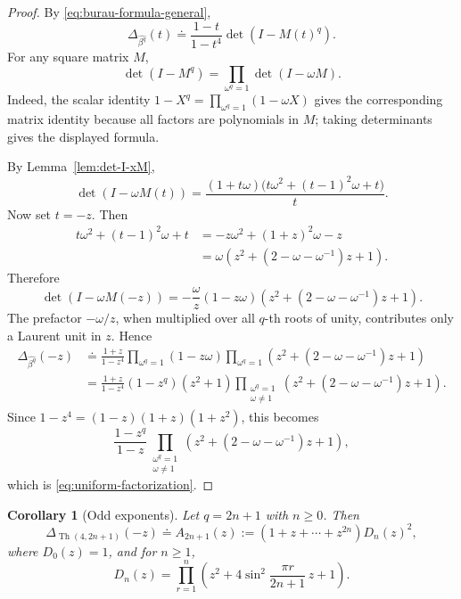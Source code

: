 \documentclass[11pt]{amsart}
\newtheorem{corollary}[theorem]{Corollary}
\newcommand{\Th}{\operatorname{Th}}
\newcommand{\dd}{\doteq}
\begin{document}
\begin{proof}
By \eqref{eq:burau-formula-general},
\[
        \Delta_{\widehat{\beta^q}}(t)
        \dd
        \frac{1-t}{1-t^4}\det(I-M(t)^q).
\]
For any square matrix \(M\),
\[
        \det(I-M^q)=\prod_{\omega^q=1}\det(I-\omega M).
\]
Indeed, the scalar identity \(1-X^q=\prod_{\omega^q=1}(1-\omega X)\) gives the corresponding matrix identity because all factors are polynomials in \(M\); taking determinants gives the displayed formula.

By Lemma~\ref{lem:det-I-xM},
\[
        \det(I-\omega M(t))
        =\frac{(1+t\omega)\bigl(t\omega^2+(t-1)^2\omega+t\bigr)}{t}.
\]
Now set \(t=-z\).  Then
\[
\begin{aligned}
        t\omega^2+(t-1)^2\omega+t
        &=-z\omega^2+(1+z)^2\omega-z  \\
        &=\omega\left(z^2+(2-\omega-\omega^{-1})z+1\right).
\end{aligned}
\]
Therefore
\begin{equation}\label{eq:single-root-factor}
        \det(I-\omega M(-z))
        =-\frac{\omega}{z}(1-z\omega)
        \left(z^2+(2-\omega-\omega^{-1})z+1\right).
\end{equation}
The prefactor \(-\omega/z\), when multiplied over all \(q\)-th roots of unity, contributes only a Laurent unit in \(z\).  Hence
\[
\begin{aligned}
\Delta_{\widehat{\beta^q}}(-z)
&\dd
\frac{1+z}{1-z^4}
\prod_{\omega^q=1}(1-z\omega)
\prod_{\omega^q=1}
\left(z^2+(2-\omega-\omega^{-1})z+1\right)  \\
&=
\frac{1+z}{1-z^4}(1-z^q)(z^2+1)
\prod_{\substack{\omega^q=1\\ \omega\ne1}}
\left(z^2+(2-\omega-\omega^{-1})z+1\right).
\end{aligned}
\]
Since \(1-z^4=(1-z)(1+z)(1+z^2)\), this becomes
\[
        \frac{1-z^q}{1-z}
        \prod_{\substack{\omega^q=1\\ \omega\ne1}}
        \left(z^2+(2-\omega-\omega^{-1})z+1\right),
\]
which is \eqref{eq:uniform-factorization}.
\end{proof}

\begin{corollary}[Odd exponents]\label{cor:odd-factorization}
Let \(q=2n+1\) with \(n\ge0\).  Then
\begin{equation}\label{eq:odd-factorization}
        \Delta_{\Th(4,2n+1)}(-z)
        \dd
        A_{2n+1}(z):=(1+z+\cdots+z^{2n})D_n(z)^2,
\end{equation}
where \(D_0(z)=1\), and for \(n\ge1\),
\begin{equation}\label{eq:Dn-def}
        D_n(z)=\prod_{r=1}^n
        \left(z^2+4\sin^2\frac{\pi r}{2n+1}\,z+1\right).
\end{equation}
\end{corollary}
\end{document}
